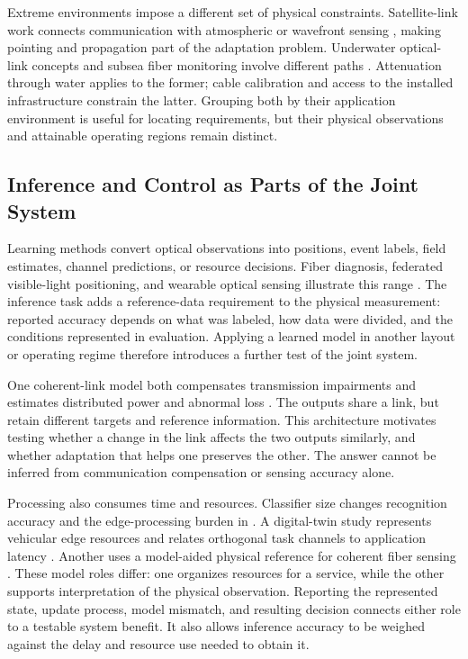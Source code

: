 Extreme environments impose a different set of physical constraints.
Satellite-link work connects communication with atmospheric or wavefront
sensing \cite{OISAC_SCR00456}, making pointing and propagation part of the
adaptation problem. Underwater optical-link concepts and subsea fiber
monitoring involve different paths \cite{OISAC_SCR00763,OISAC_SCR01095}.
Attenuation through water applies to the former; cable calibration and access
to the installed infrastructure constrain the latter. Grouping both by their
application environment is useful for locating requirements, but their
physical observations and attainable operating regions remain distinct.

\subsection{Inference and Control as Parts of the Joint System}

Learning methods convert optical observations into positions, event labels,
field estimates, channel predictions, or resource decisions. Fiber diagnosis,
federated visible-light positioning, and wearable optical sensing illustrate
this range \cite{OISAC_SCR01006,OISAC_SCR01081,OISAC_SCR00376}. The inference task
adds a reference-data requirement to the physical measurement: reported
accuracy depends on what was labeled, how data were divided, and the conditions
represented in evaluation. Applying a learned model in another layout or
operating regime therefore introduces a further test of the joint system.

One coherent-link model both compensates transmission impairments and
estimates distributed power and abnormal loss \cite{OISAC_SCR00949}. The
outputs share a link, but retain different targets and reference information.
This architecture motivates testing whether a change in the link affects the
two outputs similarly, and whether adaptation that helps one preserves the
other. The answer cannot be inferred from communication compensation or
sensing accuracy alone.

Processing also consumes time and resources. Classifier size changes
recognition accuracy and the edge-processing burden in
\cite{OISAC_SCR01047}. A digital-twin study represents vehicular edge resources
and relates orthogonal task channels to application latency
\cite{OISAC_SCR01059}. Another uses a model-aided physical reference for coherent
fiber sensing \cite{OISAC_SCR01185}. These model roles differ: one organizes
resources for a service, while the other supports interpretation of the
physical observation. Reporting the represented state, update process, model
mismatch, and resulting decision connects either role to a testable system
benefit. It also allows inference accuracy to be weighed against the delay and
resource use needed to obtain it.

